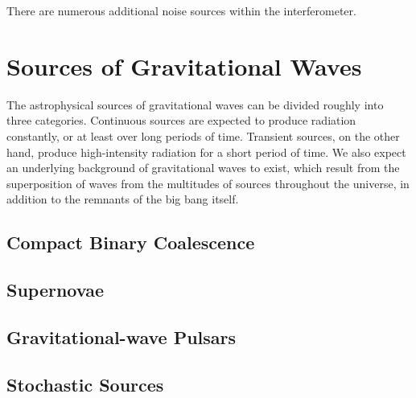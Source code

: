 \documentclass{kentigern}
\begin{document}
There are numerous additional noise sources within the interferometer.

\chapter{Sources of Gravitational Waves}
\label{cha:sourc-grav-waves}


The astrophysical sources of gravitational waves can be divided
roughly into three categories\cite{2009LRR....12....2S}. Continuous
sources are expected to produce radiation constantly, or at least over
long periods of time. Transient sources, on the other hand, produce
high-intensity radiation for a short period of time. We also expect an
underlying background of gravitational waves to exist, which result
from the superposition of waves from the multitudes of sources
throughout the universe, in addition to the remnants of the big bang
itself.


\section{Compact Binary Coalescence}
\label{sec:cbc}


\section{Supernovae}
\label{sec:sn}


\section{Gravitational-wave Pulsars}
\label{sec:pulsar}


\section{Stochastic Sources}
\label{sec:stochastic-sources}

\end{document}
